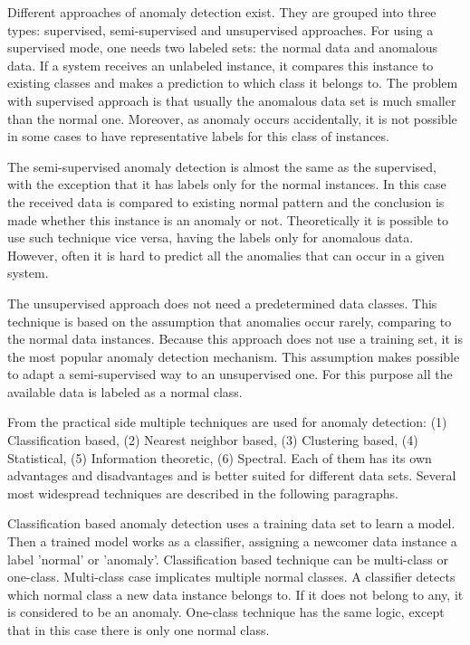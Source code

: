 Different approaches of anomaly detection exist.
They are grouped into three types: supervised, semi-supervised and unsupervised approaches.
For using a supervised mode, one needs two labeled sets: the normal data and anomalous data.
If a system receives an unlabeled instance, it compares this instance to existing classes and makes a prediction to which class it belongs to.
The problem with supervised approach is that usually the anomalous data set is much smaller than the normal one.
Moreover, as anomaly occurs accidentally, it is not possible in some cases to have representative labels for this class of instances.
 
The semi-supervised anomaly detection is almost the same as the supervised, with the exception that it has labels only for the normal instances.
In this case the received data is compared to existing normal pattern and the conclusion is made whether this instance is an anomaly or not.
Theoretically it is possible to use such technique vice versa, having the labels only for anomalous data.
However, often it is hard to predict all the anomalies that can occur in a given system.

The unsupervised approach does not need a predetermined data classes.
This technique is based on the assumption that anomalies occur rarely, comparing to the normal data instances.
Because this approach does not use a training set, it is the most popular anomaly detection mechanism.
This assumption makes possible to adapt a semi-supervised way to an unsupervised one.
For this purpose all the available data is labeled as a normal class.

From the practical side multiple techniques are used for anomaly detection:
(1) Classification based, (2) Nearest neighbor based, (3) Clustering based, (4) Statistical, (5) Information theoretic, (6) Spectral.
Each of them has its own advantages and disadvantages and is better suited for different data sets.
Several most widespread techniques are described in the following paragraphs.

Classification based anomaly detection uses a training data set to learn a model.
Then a trained model works as a classifier, assigning a newcomer data instance a label 'normal' or 'anomaly'.
Classification based technique can be multi-class or one-class.
Multi-class case implicates multiple normal classes.
A classifier detects which normal class a new data instance belongs to.
If it does not belong to any, it is considered to be an anomaly.
One-class technique has the same logic, except that in this case there is only one normal class.

